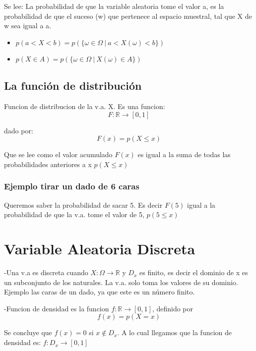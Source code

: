 \documentclass[
]{article}
\begin{document}
Se lee: La probabilidad de que la variable aleatoria tome el valor a, es
la probabilidad de que el suceso (w) que pertenece al espacio muestral,
tal que X de w sea igual a a.

\begin{itemize}
\item
  \(p(a< X< b) = p(\{\omega\in\Omega \ |\  a< X(\omega) < b\})\)
\item
  \(p(X\in A) = p(\{\omega\in\Omega \ |\  X(\omega)\in A\})\)
\end{itemize}

\hypertarget{la-funciuxf3n-de-distribuciuxf3n}{%
\subsection{La función de
distribución}\label{la-funciuxf3n-de-distribuciuxf3n}}

Funcion de distribucion de la v.a. X. Es una funcion:
\[F:\mathbb{R}\longrightarrow [0,1]\]

dado por: \[F(x)=p(X\le x)\]

Que se lee como el valor acumulado \(F(x)\) es igual a la suma de todas
las probabilidades anteriores a x \(p(X\le x)\)

\hypertarget{ejemplo-tirar-un-dado-de-6-caras}{%
\subsubsection{Ejemplo tirar un dado de 6
caras}\label{ejemplo-tirar-un-dado-de-6-caras}}

Queremos saber la probabilidad de sacar 5. Es decir \(F(5)\) igual a la
probabilidad de que la v.a. tome el valor de 5, \(p(5\le x)\)

\hypertarget{variable-aleatoria-discreta}{%
\section{Variable Aleatoria
Discreta}\label{variable-aleatoria-discreta}}

-Una v.a es discreta cuando \(X:\Omega\longrightarrow\mathbb{R}\) y
\(D_x\) es finito, es decir el dominio de x es un subconjunto de los
naturales. La v.a. solo toma los valores de su dominio. Ejemplo las
caras de un dado, ya que este es un número finito.

-Funcion de densidad es la funcion \(f:\mathbb{R}\longrightarrow[0,1]\),
definido por \[f(x)=p(X=x)\]

Se concluye que \(f(x)=0\) si \(x\not\in D_x\). A lo cual llegamos que
la funcion de densidad es: \(f: D_x\longrightarrow[0,1]\)
\end{document}
